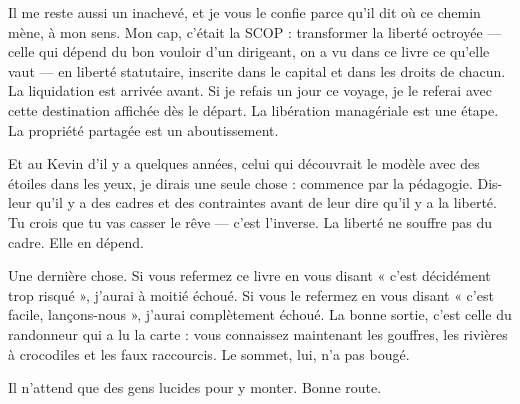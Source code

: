 Il me reste aussi un inachevé, et je vous le confie parce qu'il dit où ce chemin mène, à mon sens. Mon cap, c'était la SCOP : transformer la liberté octroyée — celle qui dépend du bon vouloir d'un dirigeant, on a vu dans ce livre ce qu'elle vaut — en liberté statutaire, inscrite dans le capital et dans les droits de chacun. La liquidation est arrivée avant. Si je refais un jour ce voyage, je le referai avec cette destination affichée dès le départ. La libération managériale est une étape. La propriété partagée est un aboutissement.

Et au Kevin d'il y a quelques années, celui qui découvrait le modèle avec des étoiles dans les yeux, je dirais une seule chose : commence par la pédagogie. Dis-leur qu'il y a des cadres et des contraintes avant de leur dire qu'il y a la liberté. Tu crois que tu vas casser le rêve — c'est l'inverse. La liberté ne souffre pas du cadre. Elle en dépend.

Une dernière chose. Si vous refermez ce livre en vous disant « c'est décidément trop risqué », j'aurai à moitié échoué. Si vous le refermez en vous disant « c'est facile, lançons-nous », j'aurai complètement échoué. La bonne sortie, c'est celle du randonneur qui a lu la carte : vous connaissez maintenant les gouffres, les rivières à crocodiles et les faux raccourcis. Le sommet, lui, n'a pas bougé.

Il n'attend que des gens lucides pour y monter. Bonne route.
